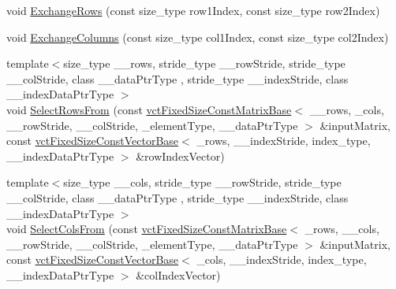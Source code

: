 {\bf }\par
\begin{DoxyCompactItemize}
\item 
void \hyperlink{classvct_fixed_size_matrix_base_a22e56e73f89499e960858563f70c9f41}{Exchange\-Rows} (const size\-\_\-type row1\-Index, const size\-\_\-type row2\-Index)
\item 
void \hyperlink{classvct_fixed_size_matrix_base_a57e3374f08831aa86879752c8850de7b}{Exchange\-Columns} (const size\-\_\-type col1\-Index, const size\-\_\-type col2\-Index)
\item 
{\footnotesize template$<$size\-\_\-type \-\_\-\-\_\-rows, stride\-\_\-type \-\_\-\-\_\-row\-Stride, stride\-\_\-type \-\_\-\-\_\-col\-Stride, class \-\_\-\-\_\-data\-Ptr\-Type , stride\-\_\-type \-\_\-\-\_\-index\-Stride, class \-\_\-\-\_\-index\-Data\-Ptr\-Type $>$ }\\void \hyperlink{classvct_fixed_size_matrix_base_a03c33204981b48b4221b3ebdb75d1fbc}{Select\-Rows\-From} (const \hyperlink{classvct_fixed_size_const_matrix_base}{vct\-Fixed\-Size\-Const\-Matrix\-Base}$<$ \-\_\-\-\_\-rows, \-\_\-cols, \-\_\-\-\_\-row\-Stride, \-\_\-\-\_\-col\-Stride, \-\_\-element\-Type, \-\_\-\-\_\-data\-Ptr\-Type $>$ \&input\-Matrix, const \hyperlink{classvct_fixed_size_const_vector_base}{vct\-Fixed\-Size\-Const\-Vector\-Base}$<$ \-\_\-rows, \-\_\-\-\_\-index\-Stride, index\-\_\-type, \-\_\-\-\_\-index\-Data\-Ptr\-Type $>$ \&row\-Index\-Vector)
\item 
{\footnotesize template$<$size\-\_\-type \-\_\-\-\_\-cols, stride\-\_\-type \-\_\-\-\_\-row\-Stride, stride\-\_\-type \-\_\-\-\_\-col\-Stride, class \-\_\-\-\_\-data\-Ptr\-Type , stride\-\_\-type \-\_\-\-\_\-index\-Stride, class \-\_\-\-\_\-index\-Data\-Ptr\-Type $>$ }\\void \hyperlink{classvct_fixed_size_matrix_base_a3133cab232f9e3ed511cf47bdc0c0272}{Select\-Cols\-From} (const \hyperlink{classvct_fixed_size_const_matrix_base}{vct\-Fixed\-Size\-Const\-Matrix\-Base}$<$ \-\_\-rows, \-\_\-\-\_\-cols, \-\_\-\-\_\-row\-Stride, \-\_\-\-\_\-col\-Stride, \-\_\-element\-Type, \-\_\-\-\_\-data\-Ptr\-Type $>$ \&input\-Matrix, const \hyperlink{classvct_fixed_size_const_vector_base}{vct\-Fixed\-Size\-Const\-Vector\-Base}$<$ \-\_\-cols, \-\_\-\-\_\-index\-Stride, index\-\_\-type, \-\_\-\-\_\-index\-Data\-Ptr\-Type $>$ \&col\-Index\-Vector)
\end{DoxyCompactItemize}

